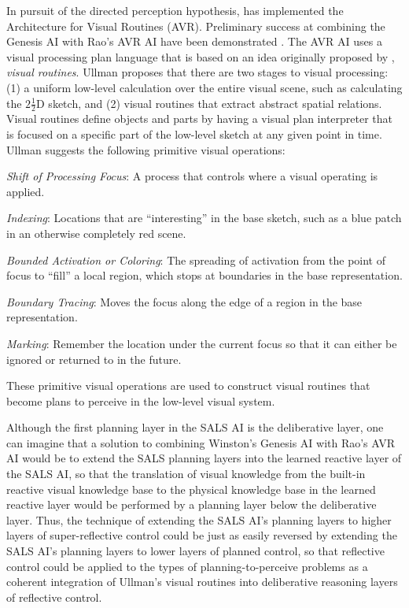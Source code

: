 In pursuit of the directed perception hypothesis, \cite{rao:1998} has
implemented the Architecture for Visual Routines (AVR).  Preliminary
success at combining the Genesis AI with Rao's AVR AI have been
demonstrated \cite[]{winston:2011}.  The AVR AI uses a visual
processing plan language that is based on an idea originally proposed
by \cite{ullman:1984}, {\emph{visual routines}}.  Ullman proposes that
there are two stages to visual processing: (1) a uniform low-level
calculation over the entire visual scene, such as calculating the
$2\frac{1}{2}$D sketch, and (2) visual routines that extract abstract
spatial relations.  Visual routines define objects and parts by having
a visual plan interpreter that is focused on a specific part of the
low-level sketch at any given point in time.  Ullman suggests the
following primitive visual operations:
\begin{packed_enumerate}
\item{\emph{Shift of Processing Focus}: A process that controls where
  a visual operating is applied.}
\item{\emph{Indexing}: Locations that are ``interesting'' in the base
  sketch, such as a blue patch in an otherwise completely red scene.}
\item{\emph{Bounded Activation or Coloring}: The spreading of
  activation from the point of focus to ``fill'' a local region, which
  stops at boundaries in the base representation.}
\item{\emph{Boundary Tracing}: Moves the focus along the edge of a
  region in the base representation.}
\item{\emph{Marking}: Remember the location under the current focus so
  that it can either be ignored or returned to in the future.}
\end{packed_enumerate}
These primitive visual operations are used to construct visual
routines that become plans to perceive
\cite[]{pryor:1992,pryorcollins:1995,velez:2011} in the low-level
visual system.

Although the first planning layer in the SALS AI is the deliberative
layer, one can imagine that a solution to combining Winston's Genesis
AI with Rao's AVR AI would be to extend the SALS planning layers into
the learned reactive layer of the SALS AI, so that the translation of
visual knowledge from the built-in reactive visual knowledge base to
the physical knowledge base in the learned reactive layer would be
performed by a planning layer below the deliberative layer.  Thus, the
technique of extending the SALS AI's planning layers to higher layers
of super-reflective control could be just as easily reversed by
extending the SALS AI's planning layers to lower layers of planned
control, so that reflective control could be applied to the types of
planning-to-perceive problems as a coherent integration of Ullman's
visual routines into deliberative reasoning layers of reflective
control.


